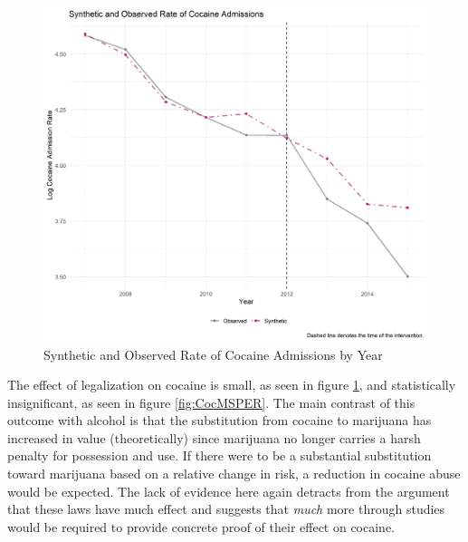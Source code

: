 \documentclass{article}
\begin{document}
\begin{figure}[H]
    \begin{center}
        \includegraphics[width=.85\textwidth]{Figure_Trend_Cocaine.png}
    \end{center}
    \caption{Synthetic and Observed Rate of Cocaine Admissions by Year}
    \label{fig:CocTrend}
\end{figure}

The effect of legalization on cocaine is small, as seen in figure \ref{fig:CocTrend}, and statistically insignificant, as seen in figure \ref{fig:CocMSPER}. The main contrast of this outcome with alcohol is that the substitution from cocaine to marijuana has increased in value (theoretically) since marijuana no longer carries a harsh penalty for possession and use. If there were to be a substantial substitution toward marijuana based on a relative change in risk, a reduction in cocaine abuse would be expected. The lack of evidence here again detracts from the argument that these laws have much effect and suggests that \emph{much} more through studies would be required to provide concrete proof of their effect on cocaine.
\end{document}
